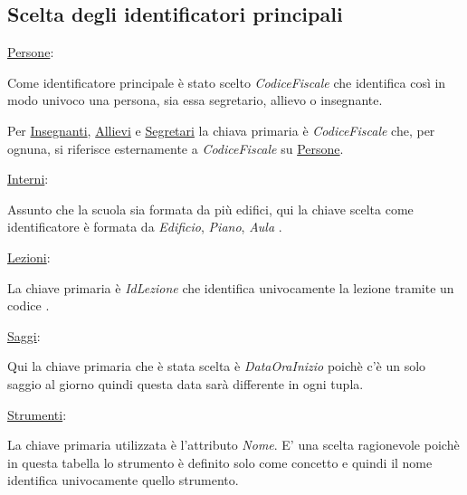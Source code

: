 \documentclass{article}
\begin{document}
\subsection{Scelta degli identificatori principali}

\underline{Persone}:
\begin{flushleft}
Come identificatore principale è stato scelto \emph{CodiceFiscale} che identifica così in modo univoco
una persona, sia essa segretario, allievo o insegnante.
\end{flushleft}

\begin{flushleft}
Per \underline{Insegnanti}, \underline{Allievi} e \underline{Segretari} la chiava primaria è \emph{CodiceFiscale} che, per ognuna, si riferisce esternamente a \emph{CodiceFiscale} su \underline{Persone}.
\end{flushleft}

\begin{flushleft}
\underline{Interni}:
\end{flushleft}

\begin{flushleft}
Assunto che la scuola sia formata da più edifici, qui la chiave scelta come identificatore è formata da \emph{Edificio}, \emph{Piano}, \emph{Aula} .
\end{flushleft}

\begin{flushleft}
\underline{Lezioni}:
\end{flushleft}

\begin{flushleft}
La chiave primaria è \emph{IdLezione} che identifica univocamente la lezione tramite un codice .
\end{flushleft}

\begin{flushleft}
\underline{Saggi}:
\end{flushleft}

\begin{flushleft}
Qui la chiave primaria che è stata scelta è \emph{DataOraInizio} poichè c'è un solo saggio al giorno quindi questa data sarà differente in ogni tupla.
\end{flushleft}

\begin{flushleft}
\underline{Strumenti}:
\end{flushleft}

\begin{flushleft}
La chiave primaria utilizzata è l'attributo \emph{Nome}.
E' una scelta ragionevole poichè in questa tabella lo strumento è definito solo come concetto e quindi il nome identifica univocamente quello strumento.
\end{flushleft}
\end{document}
